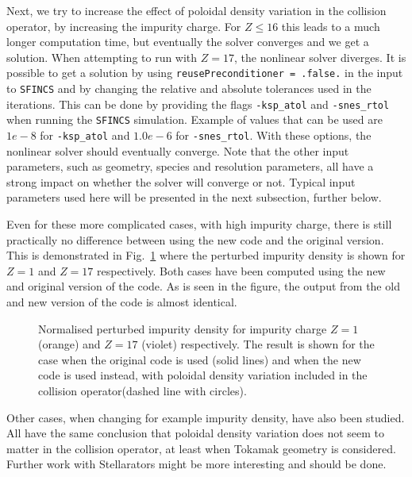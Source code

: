 \documentclass[12pt]{article}
\begin{document}
Next, we try to increase the effect of poloidal density variation in the collision operator, by increasing the impurity charge. For $Z \le 16$ this leads to a much longer computation time, but eventually the solver converges and we get a solution. When attempting to run with $Z = 17$, the nonlinear solver diverges. It is possible to get a solution by using \texttt{reusePreconditioner = .false.} in the input to \texttt{SFINCS} and by changing the relative and absolute tolerances used in the iterations. This can be done by providing the flags \texttt{-ksp\_atol} and \texttt{-snes\_rtol} when running the \texttt{SFINCS} simulation. Example of values that can be used are $1e-8$ for \texttt{-ksp\_atol} and $1.0e-6$ for \texttt{-snes\_rtol}. With these options, the nonlinear solver should eventually converge. Note that the other input parameters, such as geometry, species and resolution parameters, all have a strong impact on whether the solver will converge or not. Typical input parameters used here will be presented in the next subsection, further below. 

Even for these more complicated cases, with high impurity charge, there is still practically no difference between using the new code and the original version. This is demonstrated in Fig.~\ref{fig:0} where the perturbed impurity density is shown for $Z=1$ and $Z=17$ respectively. Both cases have been computed using the new and original version of the code. As is seen in the figure, the output from the old and new version of the code is almost identical. 

\begin{figure}
 \setlength\figureheight{0.4\textheight}
 \setlength{}
    \centering
    
    \caption{Normalised perturbed impurity density for impurity charge $Z = 1$ (orange) and $Z = 17$ (violet) respectively. The result is shown for the case when the original code is used (solid lines) and  when the new code is used instead, with poloidal density variation included in the collision operator(dashed line with circles).}
            \label{fig:0}
      \end{figure} 

Other cases, when changing for example impurity density, have also been studied. All have the same conclusion that poloidal density variation does not seem to matter in the collision operator, at least when Tokamak geometry is considered. Further work with Stellarators might be more interesting and should be done.
\end{document}
